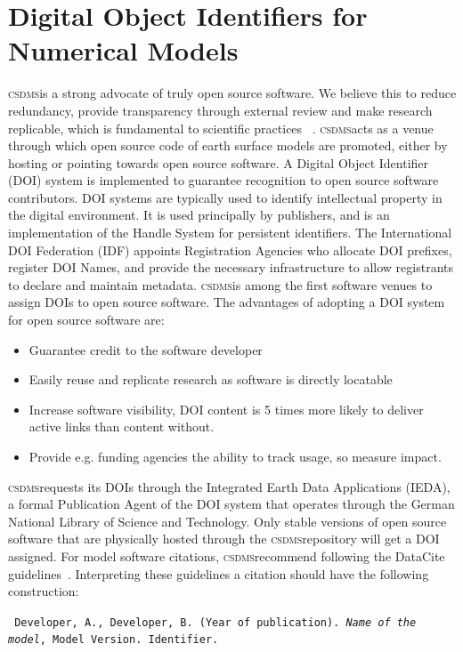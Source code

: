 \documentclass[11pt, oneside]{amsart}
\DeclareRobustCommand{\csdms}{\textsc{csdms}}
\begin{document}
\section{Digital Object Identifiers for Numerical Models}

\csdms is a strong advocate of truly open source software.  We believe this to
reduce redundancy, provide transparency through external review and make
research replicable, which is fundamental to scientific practices
~\cite{ince2012case}. \csdms acts as a venue through which open source code of
earth surface models are promoted, either by hosting or pointing towards open
source software. A Digital Object Identifier (DOI) system is implemented to
guarantee recognition to open source software contributors. DOI systems are
typically used to identify intellectual property in the digital environment.
It is used principally by publishers, and is an implementation of the Handle
System for persistent identifiers. The International DOI Federation (IDF)
appoints Registration Agencies who allocate DOI prefixes, register DOI Names,
and provide the necessary infrastructure to allow registrants to declare and
maintain metadata. \csdms is among the first software venues to assign DOIs to
open source software. The advantages of adopting a DOI system for open source
software are: 
\begin{itemize}
\item Guarantee credit to the software developer
\item Easily reuse and replicate research as software is directly locatable 
\item Increase software visibility, DOI content is 5 times more likely to
      deliver active links than content without.
\item Provide e.g. funding agencies the ability to track usage, so measure
      impact.
\end{itemize}

\csdms requests its DOIs through the Integrated Earth Data Applications (IEDA),
a formal Publication Agent of the DOI system that operates through the German
National Library of Science and Technology. Only stable versions of open source
software that are physically hosted through the \csdms repository will get a DOI
assigned. For model software citations, \csdms recommend following the DataCite
guidelines~\cite{brase2009datacite}. Interpreting these guidelines a citation
should have the following construction:

\begin{shaded}
\leftskip 0.25in
\parindent -0.25in
\tt{
Developer, A., Developer, B. (Year of publication). \emph{Name of the model},
Model Version. Identifier.
}
\end{shaded}
\end{document}
